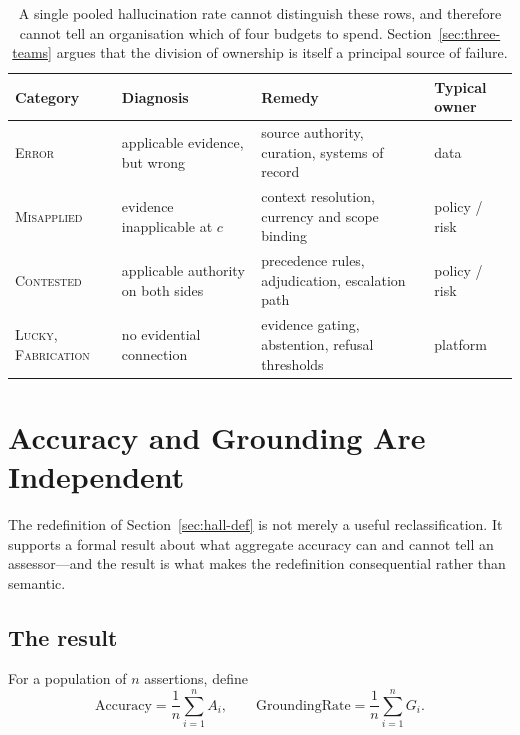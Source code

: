 \documentclass[11pt]{article}
\theoremstyle{plain}
\theoremstyle{definition}
\begin{document}
\begin{table}[ht]
  \centering
  \begin{tabular}{@{}>{\raggedright\arraybackslash}p{2.6cm}>{\raggedright\arraybackslash}p{4.0cm}>{\raggedright\arraybackslash}p{4.4cm}>{\raggedright\arraybackslash}p{2.3cm}@{}}
    \toprule
    Category & Diagnosis & Remedy & Typical owner \\
    \midrule
    \textsc{Error}
      & applicable evidence, but wrong
      & source authority, curation, systems of record
      & data \\
    \addlinespace
    \textsc{Misapplied}
      & evidence inapplicable at $c$
      & context resolution, currency and scope binding
      & policy / risk \\
    \addlinespace
    \textsc{Contested}
      & applicable authority on both sides
      & precedence rules, adjudication, escalation path
      & policy / risk \\
    \addlinespace
    \textsc{Lucky}, \textsc{Fabrication}
      & no evidential connection
      & evidence gating, abstention, refusal thresholds
      & platform \\
    \bottomrule
  \end{tabular}
  \caption{A single pooled hallucination rate cannot distinguish these rows, and
    therefore cannot tell an organisation which of four budgets to spend.
    Section~\ref{sec:three-teams} argues that the division of ownership is itself
    a principal source of failure.}
  \label{tab:remedies}
\end{table}


\section{Accuracy and Grounding Are Independent}
\label{sec:independence}

The redefinition of Section~\ref{sec:hall-def} is not merely a useful
reclassification. It supports a formal result about what aggregate accuracy can and
cannot tell an assessor---and the result is what makes the redefinition consequential
rather than semantic.

\subsection{The result}

For a population of $n$ assertions, define
\begin{equation}
  \mathrm{Accuracy} = \frac{1}{n}\sum_{i=1}^{n} A_i,
  \qquad
  \mathrm{GroundingRate} = \frac{1}{n}\sum_{i=1}^{n} G_i.
  \label{eq:rates}
\end{equation}
\end{document}
